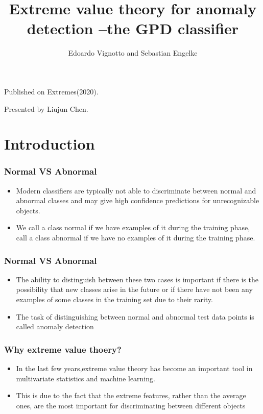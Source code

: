 \documentclass{beamer}
\author{Edoardo Vignotto and Sebastian Engelke}
\title{Extreme value theory for anomaly detection –the GPD classifier}
\begin{document}
\begin{frame}
\titlepage
\begin{center}
    Published on Extremes(2020).

    \bigskip
    Presented by Liujun Chen.
\end{center}
\end{frame}


\section{Introduction}
\begin{frame}
    \frametitle{Normal VS Abnormal}

    \begin{itemize}
        \item Modern classifiers are typically not able to discriminate between normal and abnormal classes and may give high confidence predictions for unrecognizable objects.
        \bigskip 
        \item We call a class normal if we have examples of it during the training phase, call a class abnormal if we have no examples of it during the training phase.
    \end{itemize}
\end{frame}

\begin{frame}
    \frametitle{Normal VS Abnormal}
\begin{itemize}    
    \item The ability to distinguish between these two cases is important if there is the possibility that new classes arise in the future or if there have not been any examples of some classes in the training set due to their rarity.
    \bigskip
    \item The task of distinguishing between normal and abnormal test data points is called anomaly detection
\end{itemize}
    
\end{frame}

\begin{frame}
    \frametitle{Why extreme value thoery?}
\begin{itemize}
    \item  In the last few years,extreme value theory has become an important tool in multivariate statistics and machine learning.
    \bigskip
    \item  This is due to the fact that the extreme features, rather than the average ones, are the most important for discriminating between different objects
\end{itemize}
    

\end{frame}
\end{document}
